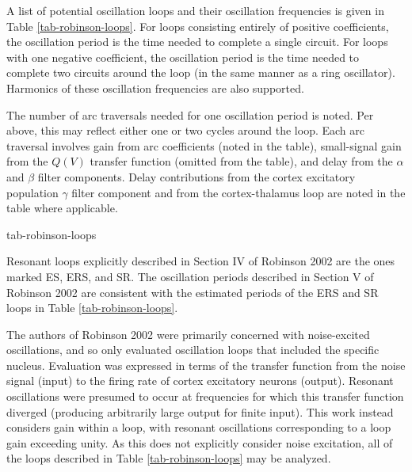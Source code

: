A list of potential oscillation loops and their oscillation frequencies is
given in Table \ref{tab-robinson-loops}. For loops consisting entirely of
positive coefficients, the oscillation period is the time needed to complete
a single circuit. For loops with one negative coefficient, the oscillation
period is the time needed to complete two circuits around the loop (in the
same manner as a ring oscillator). Harmonics of these oscillation frequencies
are also supported.

The number of arc traversals needed for one oscillation period is noted.
Per above, this may reflect either one or two cycles around the loop. Each
arc traversal involves gain from arc coefficients (noted in the table),
small-signal gain from the $Q(V)$ transfer function (omitted from the table),
and delay from the $\alpha$ and $\beta$ filter components. Delay
contributions from the cortex excitatory population $\gamma$ filter
component and from the cortex-thalamus loop are noted in the table where
applicable.

{tab-robinson-loops}

Resonant loops explicitly described in Section IV of Robinson 2002 are the
ones marked ES, ERS, and SR. The oscillation periods described in Section
V of Robinson 2002 are consistent with the estimated periods of the ERS and
SR loops in Table \ref{tab-robinson-loops}.

The authors of Robinson 2002 were primarily concerned with noise-excited
oscillations, and so only evaluated oscillation loops that included the
specific nucleus. Evaluation was expressed in terms of the transfer
function from the noise signal (input) to the firing rate of cortex
excitatory neurons (output). Resonant oscillations were presumed to occur
at frequencies for which this transfer function diverged (producing
arbitrarily large output for finite input). This work instead considers
gain within a loop, with resonant oscillations corresponding to a loop
gain exceeding unity. As this does not explicitly consider noise excitation,
all of the loops described in Table \ref{tab-robinson-loops} may be
analyzed.

